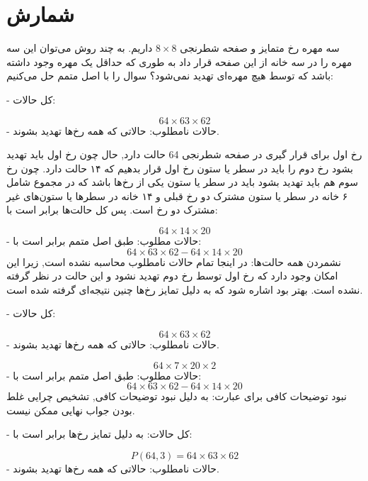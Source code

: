 \documentclass[11pt,largemargins]{h2wp}
\begin{document}
\chapter*{شمارش}


\question


سه مهره رخ متمایز و صفحه شطرنجی $8\times8$ داریم. به چند روش می‌توان این سه مهره را در سه خانه از این صفحه قرار داد به طوری که حداقل یک مهره وجود داشته باشد که توسط هیچ مهره‌ای تهدید نمی‌شود؟
\solution
  سوال را با اصل متمم حل می‌کنیم:
  
      -  کل حالات:
      
        \[64\times63\times62\]
      -  حالات نامطلوب: حالاتی که همه رخ‌ها تهدید بشوند.
      
         رخ اول برای قرار گیری در صفحه شطرنجی 64 حالت دارد, حال چون رخ اول باید تهدید بشود رخ دوم را باید در سطر یا ستون رخ اول قرار بدهیم که ۱۴ حالت دارد. چون رخ سوم هم باید تهدید بشود باید در سطر یا ستون یکی از رخ‌ها باشد که در مجموع شامل ۶ خانه در سطر یا ستون مشترک دو رخ قبلی و ۱۴ خانه در سطرها یا ستون‌های غیر مشترک دو رخ است. پس کل حالت‌ها برابر است با:
         
         \[64\times14\times20\]
-         حالات مطلوب: طبق اصل متمم برابر است با:
         \[64\times63\times62 - 64\times14\times20\]
\notes
{}
نشمردن همه حالت‌ها: در اینجا تمام حالات نامطلوب محاسبه نشده است, زیرا این امکان وجود دارد که رخ اول توسط رخ دوم تهدید نشود و این حالت در نظر گرفته نشده است.
بهتر بود اشاره شود که به دلیل تمایز رخ‌ها چنین نتیجه‌ای گرفته شده است.

\solution
     -  کل حالات:
     
        \[64\times63\times62\]
      -  حالات نامطلوب: حالاتی که همه رخ‌ها تهدید بشوند.
      
         \[64\times7\times20\times2\]
-         حالات مطلوب: طبق اصل متمم برابر است با:
         \[64\times63\times62 - 64\times14\times20\]
\notes
{}
نبود توضیحات کافی برای عبارت: به دلیل نبود توضیحات کافی, تشخیص چرایی غلط بودن جواب نهایی ممکن نیست.

   -  کل حالات: به دلیل تمایز رخ‌ها برابر است با:
   
        \[ P(64,3) = 64\times63\times62\]
      -  حالات نامطلوب: حالاتی که همه رخ‌ها تهدید بشوند.
      
\end{document}
